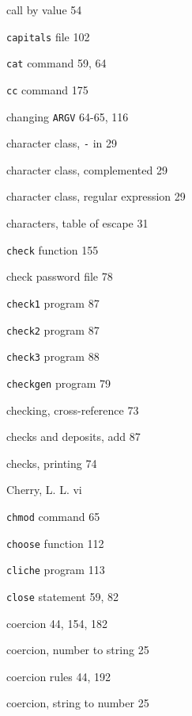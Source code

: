 \begin{multicols}{3}
\hangindent=3pc  call by value 54

\hangindent=3pc  \verb'capitals' file 102

\hangindent=3pc  \verb'cat' command 59, 64

\hangindent=3pc  \verb'cc' command 175

\hangindent=3pc  changing \verb'ARGV' 64-65, 116

\hangindent=3pc  character class, \verb'-' in 29

\hangindent=3pc  character class, complemented 29

\hangindent=3pc  character class, regular expression 29

\hangindent=3pc  characters, table of escape 31

\hangindent=3pc  \verb'check' function 155

\hangindent=3pc  check password file 78

\hangindent=3pc  \verb'check1' program 87

\hangindent=3pc  \verb'check2' program 87

\hangindent=3pc  \verb'check3' program 88

\hangindent=3pc  \verb'checkgen' program 79

\hangindent=3pc  checking, cross-reference 73

\hangindent=3pc  checks and deposits, add 87

\hangindent=3pc  checks, printing 74

\hangindent=3pc  Cherry, L. L. vi

\hangindent=3pc  \verb'chmod' command 65

\hangindent=3pc  \verb'choose' function 112

\hangindent=3pc  \verb'cliche' program 113

\hangindent=3pc  \verb'close' statement 59, 82

\hangindent=3pc  coercion 44, 154, 182

\hangindent=3pc  coercion, number to string 25

\hangindent=3pc  coercion rules 44, 192

\hangindent=3pc  coercion, string to number 25


\end{multicols}
